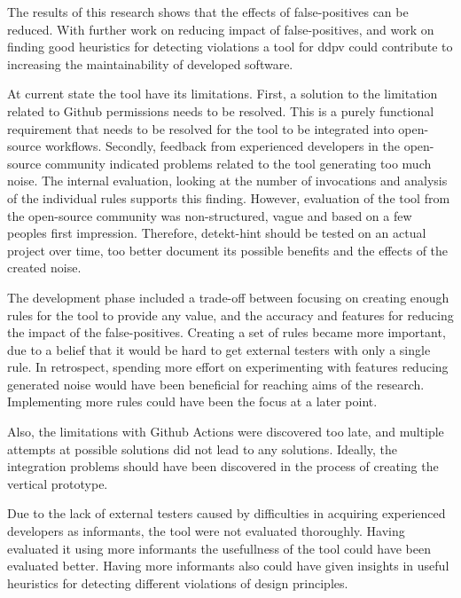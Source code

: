 \documentclass{report}
\begin{document}
The results of this research shows that the effects of false-positives can be reduced. With further work on reducing impact of false-positives, and work on finding good heuristics for detecting violations a tool for \gls{ddpv} could contribute to increasing the maintainability of developed software.


At current state the tool have its limitations. First, a solution to the limitation related to Github permissions needs to be resolved. This is a purely functional requirement that needs to be resolved for the tool to be integrated into open-source workflows. Secondly, feedback from experienced developers in the open-source community indicated problems related to the tool generating too much noise. The internal evaluation, looking at the number of invocations and analysis of the individual rules supports this finding. However, evaluation of the tool from the open-source community was non-structured, vague and based on a few peoples first impression. Therefore, detekt-hint should be tested on an actual project over time, too better document its possible benefits and the effects of the created noise.

The development phase included a trade-off between focusing on creating enough rules for the tool to provide any value, and the accuracy and features for reducing the impact of the false-positives. Creating a set of rules became more important, due to a belief that it would be hard to get external testers with only a single rule. In retrospect, spending more effort on experimenting with features reducing generated noise would have been beneficial for reaching aims of the research. Implementing more rules could have been the focus at a later point.

Also, the limitations with Github Actions were discovered too late, and multiple attempts at possible solutions did not lead to any solutions. Ideally, the integration problems should have been discovered in the process of creating the vertical prototype.

Due to the lack of external testers caused by difficulties in acquiring experienced developers as informants, the tool were not evaluated thoroughly. Having evaluated it using more informants the usefullness of the tool could have been evaluated better. Having more informants also could have given insights in useful heuristics for detecting different violations of design principles.
\end{document}
